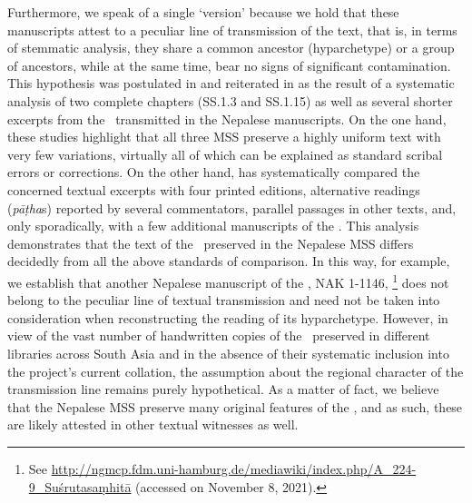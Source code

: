 Furthermore, we speak of a single `version' because we hold that these manuscripts attest to a peculiar line of transmission of the text, that is, in terms of stemmatic analysis, they share
a common ancestor (hyparchetype) or a group of ancestors, while at the same time, bear no signs of significant contamination. This hypothesis was postulated in \citet{kleb-2010} and reiterated in \citet{kleb-2021a} as the result of a systematic analysis of two complete chapters (SS.1.3 and SS.1.15)
as well as several shorter excerpts from the \SS\ transmitted in the Nepalese manuscripts. 
On the one hand, these studies highlight that all three MSS preserve a highly uniform text with very few variations, virtually all of which can be explained as standard scribal errors or corrections. 
On the other hand, \citet{kleb-2010,kleb-2021a} has systematically compared
the concerned textual excerpts with four printed editions, alternative readings (\emph{pāṭha}s) reported by several commentators,
parallel passages in other texts, and, only sporadically, with a few additional manuscripts of the \SS. This analysis demonstrates that the text of the \SS\ preserved in the Nepalese MSS differs decidedly from all the above standards of comparison. In this way, for example, we establish that another Nepalese manuscript of the \SS, NAK 1-1146,%
    \footnote{%
    See 
    \url{http://ngmcp.fdm.uni-hamburg.de/mediawiki/index.php/A_224-9_Suśrutasaṃhitā}
     (accessed on November 8, 2021).%
    } 
does not belong to the peculiar line of textual transmission and need not be taken into consideration when reconstructing the reading of its hyparchetype. 
However,  in view of the vast number of handwritten copies of the \SS\ preserved in different libraries across South Asia and in the absence of their systematic inclusion into the project's current collation,
the assumption about the regional character of the transmission line remains purely hypothetical. As a matter of fact, we believe that the Nepalese MSS preserve many original features of the \SS, and as such, these are likely attested in other textual witnesses as well.

